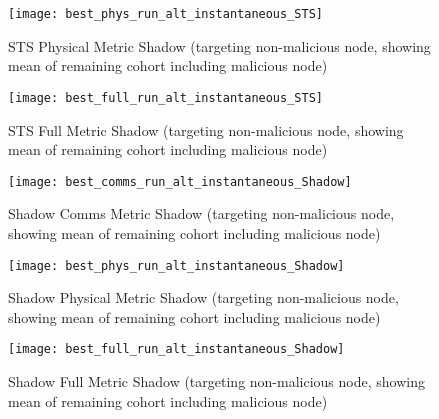 \documentclass[aspectratio=169]{beamer}
\begin{document}
\begin{frame}\begin{figure}[h]
	\centering
	\texttt{[image: best\_phys\_run\_alt\_instantaneous\_STS]}
	\caption{STS Physical Metric Shadow (targeting non-malicious node, showing mean of remaining cohort including malicious node)}
	\label{fig:phys_alt_instantaneous_sts}
\end{figure}\end{frame}

\begin{frame}\begin{figure}[h]
	\centering
	\texttt{[image: best\_full\_run\_alt\_instantaneous\_STS]}
	\caption{STS Full Metric Shadow (targeting non-malicious node, showing mean of remaining cohort including malicious node)}
	\label{fig:full_alt_instantaneous_sts}
\end{figure}\end{frame}



\begin{frame}\begin{figure}[h]
	\centering
	\texttt{[image: best\_comms\_run\_alt\_instantaneous\_Shadow]}
	\caption{Shadow Comms Metric Shadow (targeting non-malicious node, showing mean of remaining cohort including malicious node)}
	\label{fig:comms_alt_instantaneous_shadow}
\end{figure}\end{frame}

\begin{frame}\begin{figure}[h]
	\centering
	\texttt{[image: best\_phys\_run\_alt\_instantaneous\_Shadow]}
	\caption{Shadow Physical Metric Shadow (targeting non-malicious node, showing mean of remaining cohort including malicious node)}
	\label{fig:phys_alt_instantaneous_shadow}
\end{figure}\end{frame}

\begin{frame}\begin{figure}[h]
	\centering
	\texttt{[image: best\_full\_run\_alt\_instantaneous\_Shadow]}
	\caption{Shadow Full Metric Shadow (targeting non-malicious node, showing mean of remaining cohort including malicious node)}
	\label{fig:full_alt_instantaneous_shadow}
\end{figure}\end{frame}
\end{document}
